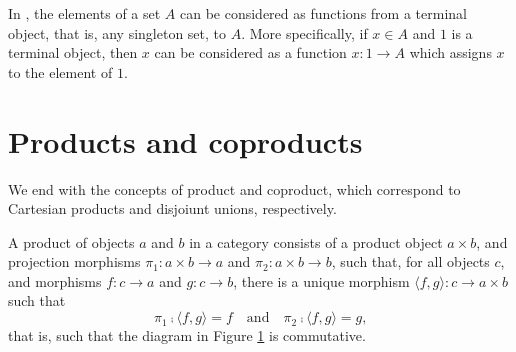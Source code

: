\begin{example}
  \label{ex:terminal-objects-constants}


  In \set, the elements of a set $A$ can be considered as functions
  from a terminal object, that is, any singleton set, to $A$. More
  specifically, if $x \in A$ and $1$ is a terminal object, then $x$
  can be considered as a function $x: 1 \to A$ which assigns $x$ to
  the element of $1$.

\end{example}

\section{Products and coproducts}
\label{sec:constructions-products-coproducts}

We end with the concepts of product and coproduct, which correspond to
Cartesian products and disjoiunt unions, respectively.

\begin{definition}
  \label{def:product}


  A product of objects $a$ and $b$ in a category  consists of a
  product object $a \times b$, and projection morphisms $\pi_{1}: a
  \times b \to a$ and $\pi_{2}: a \times b \to b$, such that, for all
  objects $c$, and morphisms $f: c \to a$ and $g: c \to b$, there is a
  unique morphism $\langle{f,g}\rangle: c \to a \times b$ such that
  \begin{equation}
    \label{eq:product}
    \pi_{1} \comp \langle{f,g}\rangle = f
    \quad
    \text{and}
    \quad
    \pi_{2} \comp \langle{f,g}\rangle = g
    \text{,}
  \end{equation}
  that is, such that the diagram in Figure \ref{fig:product} is
  commutative.

  \begin{figure}[htb]
    \begin{center}
    \end{center}
    \caption{}
    \label{fig:product}
  \end{figure}

\end{definition}

